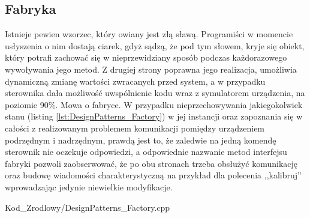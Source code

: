     \subsection{Fabryka}
        Istnieje pewien wzorzec, który owiany jest złą sławą. Programiści w momencie usłyszenia o nim dostają ciarek, gdyż sądzą, że pod tym słowem,
        kryje się obiekt, który potrafi zachować się w nieprzewidziany sposób podczas każdorazowego wywoływania jego metod. Z drugiej strony poprawna jego realizacja, 
        umożliwia dynamiczną zmianę wartości zwracanych przed system, a w przypadku sterownika dała możliwość uwspólnienie kodu wraz z symulatorem urządzenia,
        na poziomie 90\%. Mowa o fabryce\cite{gamma2005wzorce}. W przypadku nieprzechowywania jakiegokolwiek stanu (listing \ref{lst:DesignPatterns_Factory}) w jej instancji oraz zapoznania się w całości z realizowanym problemem
        komunikacji pomiędzy urządzeniem podrzędnym i nadrzędnym, prawdą jest to, że zaledwie na jedną komendę sterownik nie oczekuje odpowiedzi, a odpowiednie
        nazwanie metod interfejsu fabryki pozwoli zaobserwować, że po obu stronach trzeba obsłużyć komunikację oraz budowę wiadomości charakterystyczną na przykład
        dla polecenia ,,kalibruj'' wprowadzając jedynie niewielkie modyfikacje. 
        
        {Kod_Zrodlowy/DesignPatterns_Factory.cpp}
